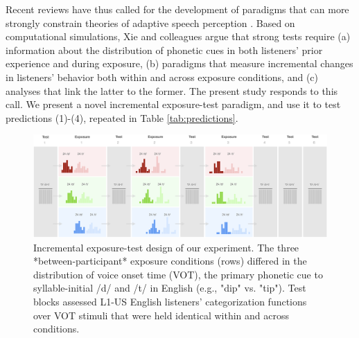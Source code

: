 \documentclass[
  11pt,
  man,mask,floatsintext]{apa6}
\begin{document}
Recent reviews have thus called for the development of paradigms that can more strongly constrain theories of adaptive speech perception \autocite{bent-baeseberk2021,coretta2023,schertz-clare2020,xie2023}. Based on computational simulations, Xie and colleagues argue that strong tests require (a) information about the distribution of phonetic cues in both listeners' prior experience and during exposure, (b) paradigms that measure incremental changes in listeners' behavior both within and across exposure conditions, and (c) analyses that link the latter to the former. The present study responds to this call. We present a novel incremental exposure-test paradigm, and use it to test predictions (1)-(4), repeated in Table \ref{tab:predictions}.

\begin{figure}[H]

{\centering \includegraphics[width=5.8in]{../figures/block_design} 

}

\caption{Incremental exposure-test design of our experiment. The three *between-participant* exposure conditions (rows) differed in the distribution of voice onset time (VOT), the primary phonetic cue to syllable-initial /d/ and /t/ in English (e.g., "dip" vs. "tip"). Test blocks assessed L1-US English listeners' categorization functions over VOT stimuli that were held identical within and across conditions.}\label{fig:block-design-figure}
\end{figure}
\end{document}
